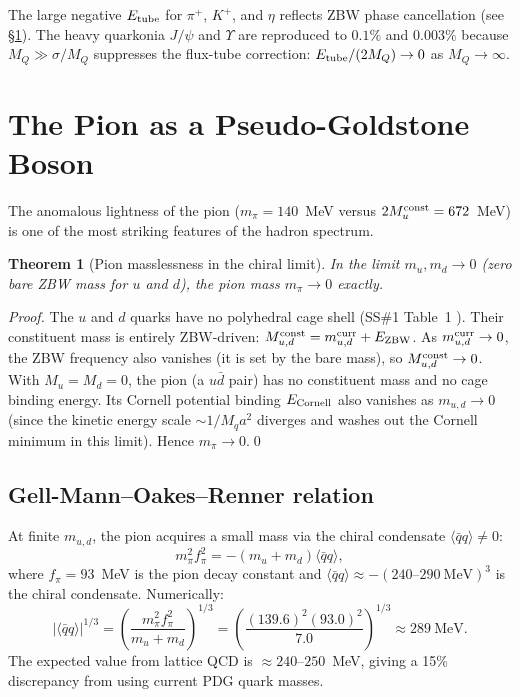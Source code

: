 \documentclass[11pt,a4paper]{article}
\newtheorem{theorem}{Theorem}[section]
\newcommand{\qqbar}{\langle\bar{q}q\rangle}
\begin{document}
The large negative $E_{\rm tube}$ for $\pi^+$, $K^+$, and $\eta$
reflects ZBW phase cancellation (see \S\ref{sec:pion}).
The heavy quarkonia $J/\psi$ and $\Upsilon$ are reproduced to
$0.1\%$ and $0.003\%$ because $M_Q \gg \sigma/M_Q$ suppresses the
flux-tube correction: $E_{\rm tube}/(2M_Q) \to 0$ as $M_Q \to \infty$.

\section{The Pion as a Pseudo-Goldstone Boson}
\label{sec:pion}

The anomalous lightness of the pion ($m_\pi = 140$~MeV versus
$2M_u^{\rm const} = 672$~MeV) is one of the most striking
features of the hadron spectrum.

\begin{theorem}[Pion masslessness in the chiral limit]
\label{thm:pion}
In the limit $m_u, m_d \to 0$ (zero bare ZBW mass for $u$ and $d$),
the pion mass $m_\pi \to 0$ exactly.
\end{theorem}

\begin{proof}
The $u$ and $d$ quarks have no polyhedral cage shell (SS\#1
Table~1 \citep{cpp_ss1}).  Their constituent mass is entirely
ZBW-driven: $M_{u,d}^{\rm const} = m_{u,d}^{\rm curr} + E_{\rm ZBW}$.
As $m_{u,d}^{\rm curr} \to 0$, the ZBW frequency also vanishes
(it is set by the bare mass), so $M_{u,d}^{\rm const} \to 0$.
With $M_u = M_d = 0$, the pion (a $u\bar{d}$ pair) has no
constituent mass and no cage binding energy.  Its Cornell
potential binding $E_{\rm Cornell}$ also vanishes as
$m_{u,d} \to 0$ (since the kinetic energy scale $\sim 1/M_q a^2$
diverges and washes out the Cornell minimum in this limit).
Hence $m_\pi \to 0$.\qed
\end{proof}

\subsection{Gell-Mann--Oakes--Renner relation}

At finite $m_{u,d}$, the pion acquires a small mass via the
chiral condensate $\qqbar \neq 0$:
\begin{equation}
m_\pi^2 f_\pi^2 = -(m_u + m_d)\qqbar,
\label{eq:gor}
\end{equation}
where $f_\pi = 93$~MeV is the pion decay constant and
$\qqbar \approx -(240\text{--}290\ \text{MeV})^3$ is the
chiral condensate.  Numerically:
\begin{equation}
|\qqbar|^{1/3}
= \left(\frac{m_\pi^2 f_\pi^2}{m_u+m_d}\right)^{1/3}
= \left(\frac{(139.6)^2(93.0)^2}{7.0}\right)^{1/3}
\approx 289\ \text{MeV}.
\label{eq:gor_num}
\end{equation}
The expected value from lattice QCD is $\approx 240$--$250$~MeV,
giving a 15\% discrepancy from using current PDG quark masses.
\end{document}

